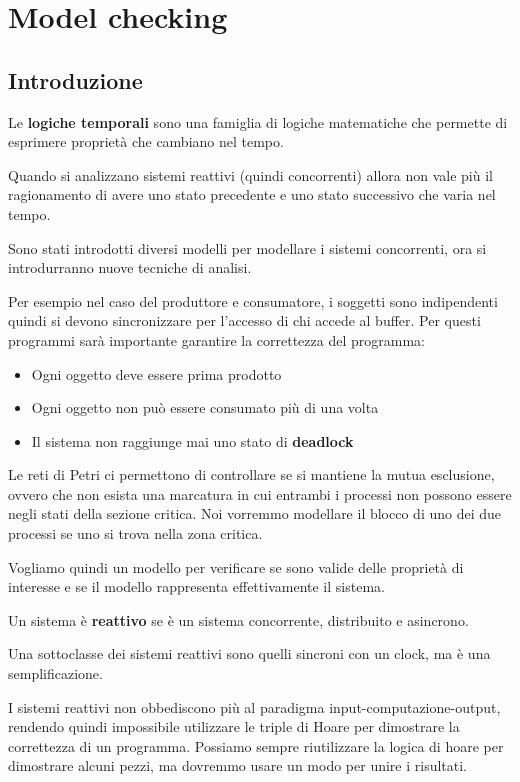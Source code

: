 \chapter{Model checking}
\section{Introduzione}
Le \textbf{logiche temporali} sono una famiglia di logiche matematiche che
permette di esprimere proprietà che cambiano nel tempo.

Quando si analizzano sistemi reattivi (quindi concorrenti) allora non vale più
il ragionamento di avere uno stato precedente e uno stato successivo che varia nel
tempo.

Sono stati introdotti diversi modelli per modellare i sistemi concorrenti, ora
si introdurranno nuove tecniche di analisi.

Per esempio nel caso del produttore e consumatore, i soggetti sono
indipendenti quindi si devono sincronizzare per l'accesso di chi accede al buffer.
Per questi programmi sarà importante garantire la correttezza del programma:
\begin{itemize}
    \item Ogni oggetto deve essere prima prodotto
    \item Ogni oggetto non può essere consumato più di una volta
    \item Il sistema non raggiunge mai uno stato di \textbf{deadlock}
\end{itemize}
Le reti di Petri ci permettono di controllare se si mantiene la mutua esclusione,
ovvero che non esista una  marcatura in cui entrambi i processi non possono essere
negli stati della sezione critica. Noi vorremmo modellare il blocco di uno dei due
processi se uno si trova nella zona critica.

Vogliamo quindi un modello per verificare se sono valide delle proprietà di
interesse e se il modello rappresenta effettivamente il sistema.
\begin{definizione}
    Un sistema è \textbf{reattivo} se è un sistema concorrente, distribuito e
    asincrono.
\end{definizione}
Una sottoclasse dei sistemi reattivi sono quelli sincroni con un clock, ma è una
semplificazione.

I sistemi reattivi non obbediscono più al paradigma input-computazione-output,
rendendo quindi impossibile utilizzare le triple di Hoare per dimostrare la
correttezza di un programma. Possiamo sempre riutilizzare la logica di hoare per
dimostrare alcuni pezzi, ma dovremmo usare un modo per unire i risultati.

